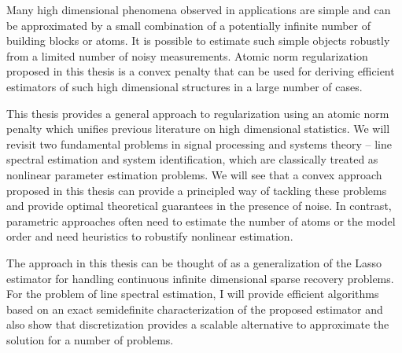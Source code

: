 Many high dimensional phenomena observed in applications are simple and can be
approximated by a small combination of a potentially infinite number of building
blocks or atoms. It is possible to estimate such simple objects robustly from a
limited number of noisy measurements. Atomic norm regularization proposed in
this thesis is a convex penalty that can be used for deriving efficient
estimators of such high dimensional structures in a large number of cases.

This thesis provides a general approach to regularization using an atomic norm
penalty which unifies previous literature on high dimensional statistics. We
will revisit two fundamental problems in signal processing and systems theory --
line spectral estimation and system identification, which are classically
treated as nonlinear parameter estimation problems. We will see that a convex
approach proposed in this thesis can provide a principled way of tackling these
problems and provide optimal theoretical guarantees in the presence of noise. In
contrast, parametric approaches often need to estimate the number of atoms or
the model order and need heuristics to robustify nonlinear estimation.

The approach in this thesis can be thought of as a generalization of the Lasso
estimator for handling continuous infinite dimensional sparse recovery problems.
For the problem of line spectral estimation, I will provide efficient algorithms
based on an exact semidefinite characterization of the proposed estimator and
also show that discretization provides a scalable alternative to approximate the
solution for a number of problems.

